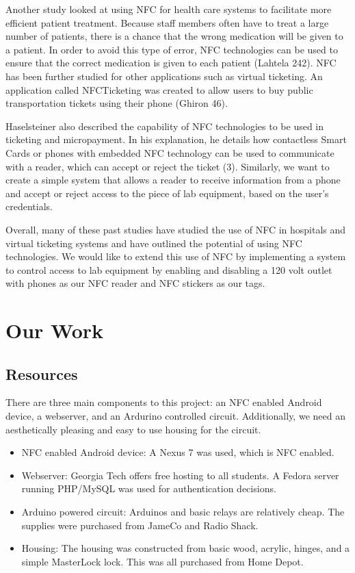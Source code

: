 \documentclass{sigchi}
\begin{document}
Another study looked at using NFC for health care systems to facilitate more efficient patient treatment. Because staff members often have to treat a large number of patients, there is a chance that the wrong medication will be given to a patient. In order to avoid this type of error, NFC technologies can be used to ensure that the correct medication is given to each patient (Lahtela 242). NFC has been further studied for other applications such as virtual ticketing. An application called NFCTicketing was created to allow users to buy public transportation tickets using their phone (Ghiron 46). 

Haselsteiner also described the capability of NFC technologies to be used in ticketing and micropayment. In his explanation, he details how contactless Smart Cards or phones with embedded NFC technology can be used to communicate with a reader, which can accept or reject the ticket (3). Similarly, we want to create a simple system that allows a reader to receive information from a phone and accept or reject access to the piece of lab equipment, based on the user’s credentials. 

Overall, many of these past studies have studied the use of NFC in hospitals and virtual ticketing systems and have outlined the potential of using NFC technologies. We would like to extend this use of NFC by implementing a system to control access to lab equipment by enabling and disabling a 120 volt outlet with phones as our NFC reader and NFC stickers as our tags.

\section{Our Work}

\subsection {Resources}
There are three main components to this project: an NFC enabled Android device, a webserver, and an Ardurino controlled circuit. Additionally, we need an aesthetically pleasing and easy to use housing for the circuit.
\begin{itemize}
\item NFC enabled Android device: A Nexus 7 was used, which is NFC enabled.
\item Webserver: Georgia Tech offers free hosting to all students. A Fedora server running PHP/MySQL was used for authentication decisions.
\item Arduino powered circuit: Arduinos and basic relays are relatively cheap. The supplies were purchased from JameCo and Radio Shack.
\item Housing: The housing was constructed from basic wood, acrylic, hinges, and a simple MasterLock lock. This was all purchased from Home Depot.
\end{itemize}
\end{document}
